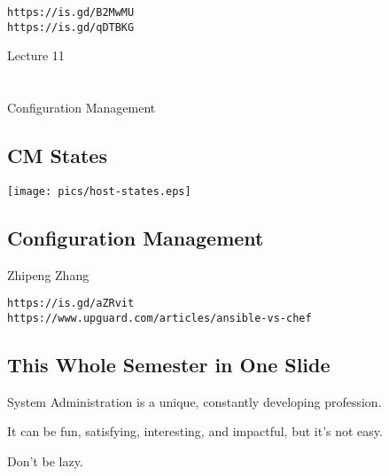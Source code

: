 \documentclass[xga]{xdvislides}
\begin{document}
\verb+https://is.gd/B2MwMU+ \\
\verb+https://is.gd/qDTBKG+

\newpage
\vspace*{\fill}
\begin{center}
    \Hugesize
        Lecture 11 \\ [1em]
    \hspace*{5mm}
    \blueline\\
    \hspace*{5mm}\\
	Configuration Management
\end{center}
\vspace*{\fill}

\subsection{CM States}
\vspace*{\fill}
\begin{center}
	\texttt{[image: pics/host-states.eps]} \\
\end{center}
\vspace*{\fill}

\subsection{Configuration Management}
Zhipeng Zhang\\
\vspace{1in}

\verb+https://is.gd/aZRvit+ \\
\verb+https://www.upguard.com/articles/ansible-vs-chef+

\subsection{This Whole Semester in One Slide}
\vspace*{\fill}
\Huge
\begin{center}
System Administration is a unique, constantly
developing profession. \\
\vspace{.5in}

It can be fun, satisfying, interesting, and impactful,
but it's not easy. \\
\vspace{.5in}

Don't be lazy.
\end{center}
\Normalsize
\vspace*{\fill}
\end{document}
